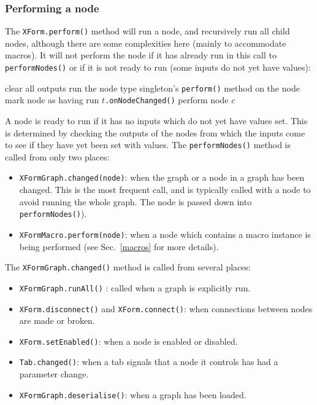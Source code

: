 \subsubsection{Performing a node}
The \texttt{XForm.perform()} method will run a node, and recursively run all child nodes, although
there are some complexities here (mainly to accommodate macros). It will not perform the node if it 
has already run in this call to \texttt{performNodes()} or if it is not ready to run (some inputs do not yet have values):
\begin{algorithmic}
\STATE clear all outputs
\STATE run the node type singleton's \texttt{perform()} method on the node
\STATE mark node as having run
\STATE $t$\texttt{.onNodeChanged()}
\ENDFOR
{}
\STATE perform node $c$
\ENDFOR
\ENDIF
\end{algorithmic}
A node is ready to run if it has no inputs which do not yet have values set. This is
determined by checking the outputs of the nodes from which the inputs come to see if
they have yet been set with values. The \texttt{performNodes()} method is called from only two places:
\begin{itemize}
\item \texttt{XFormGraph.changed(node)}: when the graph or a node in a graph has been changed. This is the most
frequent call, and is typically called with a node to avoid running the whole graph. The node is passed down into
\texttt{performNodes()}).
\item \texttt{XFormMacro.perform(node)}: when a node which contains a macro instance is being performed (see
Sec.~\ref{macros} for more details).
\end{itemize}
The \texttt{XFormGraph.changed()} method is called from several places:
\begin{itemize}
\item \texttt{XFormGraph.runAll()} : called when a graph is explicitly run.
\item \texttt{XForm.disconnect()} and \texttt{XForm.connect()}: when connections between nodes are made or broken.
\item \texttt{XForm.setEnabled()}: when a node is enabled or disabled.
\item \texttt{Tab.changed()}: when a tab signals that a node it controls has had a parameter change.
\item \texttt{XFormGraph.deserialise()}: when a graph has been loaded.
\end{itemize}

